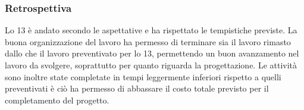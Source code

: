 \subsubsection{Retrospettiva}
\label{sec:retrospettiva_sprint13}

Lo  13 è andato secondo le aspettative e ha rispettato le tempistiche previste.
La buona organizzazione del lavoro ha permesso di terminare sia il lavoro rimasto dallo  che il lavoro preventivato per lo  13, permettendo un buon avanzamento nel lavoro da svolgere, soprattutto per quanto riguarda la progettazione. 
Le attività sono inoltre state completate in tempi leggermente inferiori rispetto a quelli preventivati è ciò ha permesso di abbassare il costo totale previsto per il completamento del progetto.
